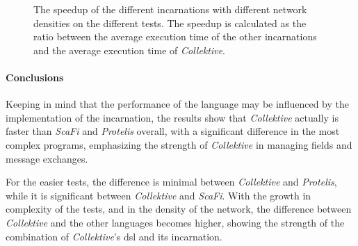 \begin{figure}[ht!]
\begin{subfigure}[b]{0.49\textwidth}
    \end{subfigure}
    \caption{The speedup of the different incarnations with different network densities on the different tests.
        The speedup is calculated as the ratio between the average execution time of the other incarnations and the average
        execution time of \emph{Collektive}.}
    \label{fig:speedup}
\end{figure}

\paragraph{Conclusions}
Keeping in mind that the performance of the language may be influenced by the implementation of the incarnation, the results
show that \emph{Collektive} actually is faster than \emph{ScaFi} and \emph{Protelis} overall, with a significant
difference in the most complex programs, emphasizing the strength of \emph{Collektive} in managing fields and message exchanges.

For the easier tests, the difference is minimal between \emph{Collektive} and \emph{Protelis}, while it is significant
between \emph{Collektive} and \emph{ScaFi}.
With the growth in complexity of the tests, and in the density of the network, the difference between \emph{Collektive}
and the other languages becomes higher, showing the strength of the combination of \emph{Collektive}'s \ac{dsl} and its incarnation.

